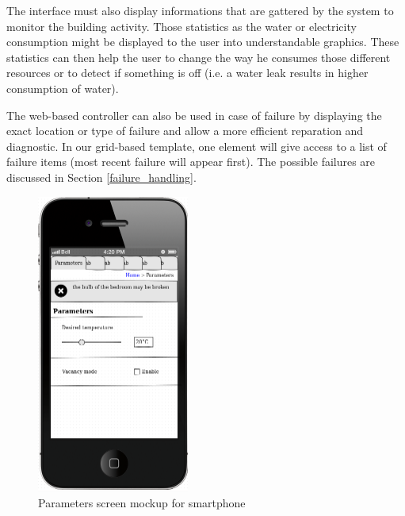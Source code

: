 \documentclass{acm_proc_article-sp}
\begin{document}
The interface must also display informations that are gattered by the system to monitor the building activity.
Those statistics as the water or electricity consumption might be displayed to the user into understandable graphics.
These statistics can then help the user to change the way he consumes those different resources or to detect if something is off (i.e. a water leak results in higher consumption of water).

The web-based controller can also be used in case of failure by displaying the exact location or type of failure and allow a more efficient reparation and diagnostic.
In our grid-based template, one element will give access to a list of failure items (most recent failure will appear first).
The possible failures are discussed in Section \ref{failure_handling}.
				\begin{figure}[htb]
  				\begin{center}
    				\includegraphics[width=5cm]{mockup}
    				\caption{Parameters screen mockup for smartphone\label{mockup}}
  				\end{center}
				\end{figure}
\end{document}
